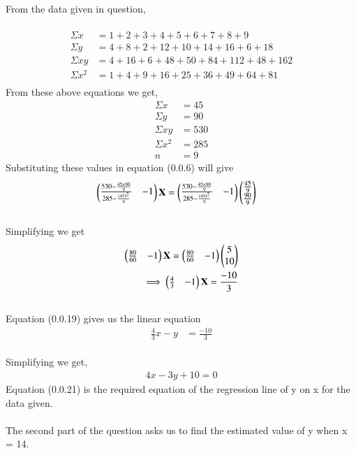 \documentclass[journal,12pt,twocolumn]{IEEEtran}
\begin{document}
From the data given in question,\\\
\begin{align}
  \Sigma x  &= 1 + 2 + 3 + 4 + 5 + 6 + 7 + 8 + 9\\
 \Sigma y  &= 4 + 8 + 2 + 12 + 10 + 14 + 16 + 6 + 18\\
 \Sigma xy &= 4 + 16 + 6 + 48 + 50 + 84 + 112 + 48 + 162\\
 \Sigma x^2 &= 1 + 4 + 9 + 16 + 25 + 36 + 49 + 64 + 81\\
\end{align}
From these above equations we get,\\
\begin{align}
  \Sigma x  &= 45\\
 \Sigma y  &= 90\\
 \Sigma xy &= 530\\
 \Sigma x^2 &= 285\\
 n &= 9
\end{align}
Substituting these values in equation (0.0.6) will give\\
\begin{align}
    \begin{pmatrix}\frac{530 - \frac{45 \times 90}{9}}{285 - \frac{(45)^2}{9}} & -1\end{pmatrix}\mathbf{X} &= \begin{pmatrix}\frac{530 - \frac{45 \times 90}{9}}{285 - \frac{(45)^2}{9}} & -1\end{pmatrix}\begin{pmatrix}\frac{45}{9} \\ \frac{90}{9}\end{pmatrix}
\end{align}\\
Simplifying we get
\begin{align}
    \begin{pmatrix}\frac{80}{60} & -1\end{pmatrix}\mathbf{X} = \begin{pmatrix}\frac{80}{60} & -1\end{pmatrix}\begin{pmatrix}5 \\ 10\end{pmatrix}
    \\
    \implies \begin{pmatrix}\frac{4}{3} & -1\end{pmatrix}\mathbf{X} = \frac{-10}{3}
\end{align}\\
Equation (0.0.19) gives us the linear equation\\
\begin{align}
    \frac{4}{3} x - y &= \frac{-10}{3}
\end{align}\\
Simplifying we get,
\begin{align}
    4x - 3y + 10 = 0 
\end{align}
Equation (0.0.21) is the required equation of the regression line of y on x for the data given.\\\\
The second part of the question asks us to find the estimated value of y when x = 14.\\
\end{document}
